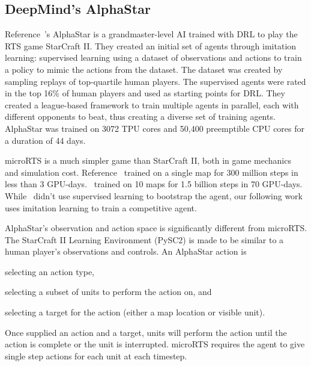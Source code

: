 \documentclass[conference]{IEEEtran}
\begin{document}
\subsection{DeepMind's AlphaStar}
Reference~\cite{Vinyals2019GrandmasterLI}'s AlphaStar is a grandmaster-level AI trained
with DRL to play the RTS game StarCraft II. They created an initial set of agents
through imitation learning: supervised learning using a dataset of observations and
actions to train a policy to mimic the actions from the dataset. The dataset was created
by sampling replays of top-quartile human players. The supervised agents were rated in
the top 16\% of human players and used as starting points for DRL. They created a
league-based framework to train multiple agents in parallel, each with different
opponents to beat, thus creating a diverse set of training agents. AlphaStar was trained
on 3072 TPU cores and 50,400 preemptible CPU cores for a duration of 44 days.

microRTS is a much simpler game than StarCraft II, both in game mechanics and simulation
cost. Reference~\cite{DBLP:journals/corr/abs-2105-13807} trained on a single map for 300 million
steps in less than 3 GPU-days. \agentName\ trained on 10 maps for 1.5 billion steps in
70 GPU-days. While \agentName\ didn't use supervised learning to bootstrap the agent,
our following work uses imitation learning to train a competitive agent.

AlphaStar's observation and action space is significantly different from microRTS. The
StarCraft II Learning Environment (PySC2) is made to be similar to a human player's
observations and controls. An AlphaStar action is 
\begin{inparaenum}[(1)]
    \item selecting an action type,
    \item selecting a subset of units to perform the action on, and
    \item selecting a target for the action (either a map location or visible unit).
\end{inparaenum}
Once supplied an action and a target, units will perform the action until the action is complete or the unit is interrupted.
microRTS requires the agent to give single step actions for each unit at each timestep.
\end{document}

